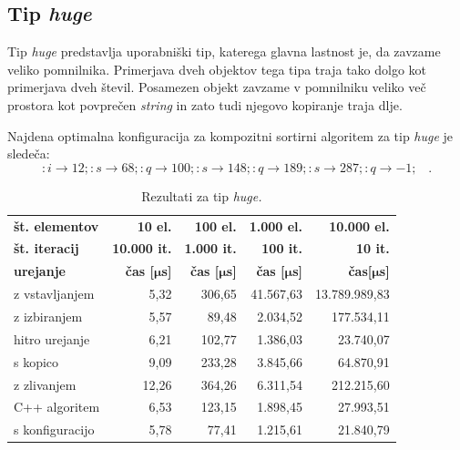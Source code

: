 \documentclass[a4paper,oneside,12pt]{article}
\newcommand{\lra}{\ensuremath{\longrightarrow}}
\newcommand{\edot}{\;\;\;.}
\newcommand{\bmu}{\ensuremath{\boldsymbol{\mu}}}
\newcommand{\usec}{\ensuremath{\bmu}s}
\begin{document}
\pagebreak
\mbox{}

\pagebreak
\mbox{}

\pagebreak

\subsection{Tip \emph{huge}}
\label{chapter:rez:huge}
Tip \emph{huge} predstavlja uporabniški tip, katerega glavna lastnost je, da zavzame veliko pomnilnika.
Primerjava dveh objektov tega tipa traja tako dolgo kot primerjava dveh števil. Posamezen objekt
zavzame v pomnilniku veliko več prostora kot povprečen \emph{string} in zato tudi njegovo kopiranje 
traja dlje.

Najdena optimalna konfiguracija za kompozitni sortirni algoritem za tip \emph{huge} je sledeča:
\[ :i \lra 12;:s \lra 68;:q \lra 100;:s \lra 148;:q \lra 189;:s \lra 287;:q \lra -1; \edot \]

\begin{table}[h!]
  \centering
  \caption[Rezultati za tip \emph{huge}]{Rezultati za tip \emph{huge.}}
  \label{tab:rez:huge} \vspace{1ex}
  \begin{tabular}{l!{\vrule width 1pt}r|r|r|r}
    \bf št. elementov  & \bf 10 el.& \bf 100 el.& \bf 1.000 el. & \bf 10.000 el. \\ 
    \bf št. iteracij   & \bf 10.000 it. & \bf 1.000 it. & \bf 100 it. & \bf 10 it. \\ \hline
    \bf urejanje       & \bf čas [\usec] & \bf čas [\usec] & \bf čas [\usec] & \bf čas[\usec] \\  
    z vstavljanjem     &  5,32 & 306,65 & 41.567,63 & 13.789.989,83 \\ \hline
    z izbiranjem       &  5,57 &  89,48 &  2.034,52 &    177.534,11 \\ \hline
    hitro urejanje     &  6,21 & 102,77 &  1.386,03 &     23.740,07 \\ \hline
    s kopico           &  9,09 & 233,28 &  3.845,66 &     64.870,91 \\ \hline
    z zlivanjem        & 12,26 & 364,26 &  6.311,54 &    212.215,60 \\ \hline
    C++ algoritem      &  6,53 & 123,15 &  1.898,45 &     27.993,51 \\ \hline
    s konfiguracijo    &  5,78 &  77,41 &  1.215,61 &     21.840,79 \\ 
  \end{tabular}
\end{table}
\end{document}
